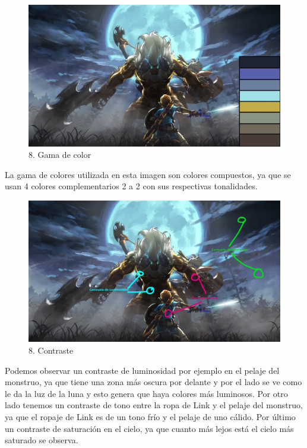 \documentclass[12pt]{article}
\begin{document}
\begin{figure}[H]
      \centering
      \includegraphics[scale=0.25]{images/Raúl/Sección 8/Imagen 8 colores.jpg}
      \caption{\small 8. Gama de color}
    \end{figure}

 La gama de colores utilizada en esta imagen son colores compuestos, ya que se usan 4 colores complementarios 2 a 2 con sus respectivas tonalidades.

\begin{figure}[H]
      \centering
      \includegraphics[scale=0.25]{images/Raúl/Sección 8/Imagen 8 contraste.jpg}
      \caption{\small 8. Contraste}
    \end{figure}

Podemos observar un contraste de luminosidad por ejemplo en el pelaje del monstruo, ya que tiene una zona más oscura por delante y por el lado se ve como le da la luz de la luna y esto genera que haya colores más luminosos. Por otro lado tenemos un contraste de tono entre la ropa de Link y el pelaje del monstruo, ya que el ropaje de Link es de un tono frío y el pelaje de uno cálido. Por último un contraste de saturación en el cielo, ya que cuanto más lejos está el cielo más saturado se observa.
\end{document}
